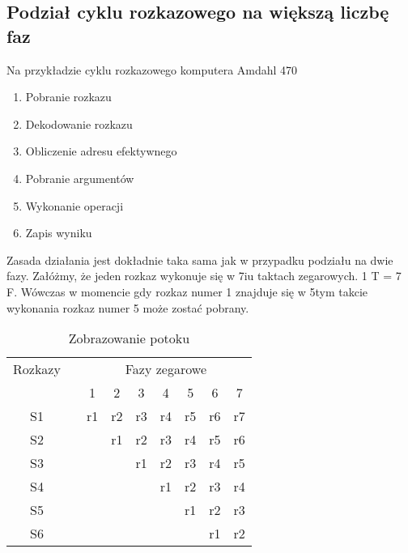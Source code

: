     	\subsection*{Podział cyklu rozkazowego na większą liczbę faz}
    	Na przykładzie cyklu rozkazowego komputera Amdahl 470
    	\begin{enumerate}
    		\item Pobranie rozkazu
    		\item Dekodowanie rozkazu
    		\item Obliczenie adresu efektywnego
    		\item Pobranie argumentów
    		\item Wykonanie operacji
    		\item Zapis wyniku
    	\end{enumerate}
    	Zasada działania jest dokładnie taka sama jak w przypadku podziału na dwie fazy. Załóżmy, że jeden rozkaz wykonuje się w 7iu taktach zegarowych. 1 T = 7 F. Wówczas w momencie gdy rozkaz numer 1 znajduje się w 5tym takcie wykonania rozkaz numer 5 może zostać pobrany.
    	\begin{table}[htbp]
    		\centering
    		\caption{Zobrazowanie potoku}
    		\begin{tabular}{|r|r|r|r|r|r|r|r|r|}
    			\multicolumn{1}{r}{Rozkazy} & \multicolumn{1}{r}{} & \multicolumn{7}{c}{Fazy zegarowe} \\
    			\multicolumn{1}{r}{} & \multicolumn{1}{r}{} & \multicolumn{1}{c}{1} & \multicolumn{1}{c}{2} & \multicolumn{1}{c}{3} & \multicolumn{1}{c}{4} & \multicolumn{1}{c}{5} & \multicolumn{1}{c}{6} & \multicolumn{1}{c}{7} \bigstrut[b]\\
    			\cline{1-1}\cline{3-9}    \multicolumn{1}{|c|}{S1} &       & r1    & r2    & r3    & r4    & r5    & r6    & r7 \bigstrut\\
    			\cline{1-1}\cline{3-9}    \multicolumn{1}{|c|}{S2} &       &       & r1    & r2    & r3    & r4    & r5    & r6 \bigstrut\\
    			\cline{1-1}\cline{3-9}    \multicolumn{1}{|c|}{S3} &       &       &       & r1    & r2    & r3    & r4    & r5 \bigstrut\\
    			\cline{1-1}\cline{3-9}    \multicolumn{1}{|c|}{S4} &       &       &       &       & r1    & r2    & r3    & r4 \bigstrut\\
    			\cline{1-1}\cline{3-9}    \multicolumn{1}{|c|}{S5} &       &       &       &       &       & r1    & r2    & r3 \bigstrut\\
    			\cline{1-1}\cline{3-9}    \multicolumn{1}{|c|}{S6} &       &       &       &       &       &       & r1    & r2 \bigstrut\\
    			\cline{1-1}\cline{3-9}    \end{tabular}%
    		\label{tab:addlabel}%
    	\end{table}%
